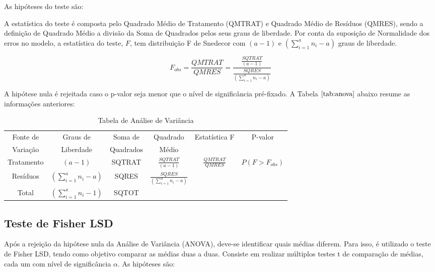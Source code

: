\documentclass[
]{estat/estat}
\begin{document}
As hipóteses do teste são:


A estatística do teste é composta pelo Quadrado Médio de Tratamento
(QMTRAT) e Quadrado Médio de Resíduos (QMRES), sendo a definição de
Quadrado Médio a divisão da Soma de Quadrados pelos seus graus de
liberdade. Por conta da suposição de Normalidade dos erros no modelo, a
estatística do teste, \(F\), tem distribuição F de Snedecor com
\((a - 1)\) e \((\sum_{i=1}^a n_i - a)\) graus de liberdade.

\[
F_{obs} = \frac{QMTRAT}{QMRES} = \frac{\frac{SQTRAT}{(a-1)}}{\frac{SQRES}{(\sum_{i=1}^a n_i - a)}}
\]

A hipótese nula é rejeitada caso o p-valor seja menor que o nível de
significância pré-fixado. A Tabela \(\ref{tab:anova}\) abaixo resume as
informações anteriores:

\begin{table}[H]
\centering
\caption{Tabela de Análise de Variância}
\begin{tabular}{c | c c c c c}
    \toprule 
    Fonte de & Graus de  & Soma de  & Quadrado  & \multirow{2}{*}{Estatística F} & \multirow{2}{*}{P-valor} \\ 
    Variação & Liberdade & Quadrados & Médio & & \\
    \midrule
    Tratamento & $(a-1)$ & SQTRAT & $\frac{SQTRAT}{(a-1)}$ & $\frac{QMTRAT}{QMRES}$ & $P(F>F_{obs})$ \\[5pt]
    Resíduos & $(\sum_{i=1}^a n_i - a)$ & SQRES & $\frac{SQRES}{(\sum_{i=1}^a n_i - a)}$ & & \\ 
    \midrule
    Total & $(\sum_{i=1}^a n_i - 1)$ & SQTOT & & & \\ 
    \bottomrule
\end{tabular}

\end{table}

\subsection{Teste de Fisher LSD}\label{teste-de-fisher-lsd}

Após a rejeição da hipótese nula da Análise de Variância (ANOVA),
deve-se identificar quais médias diferem. Para isso, é utilizado o teste
de Fisher LSD, tendo como objetivo comparar as médias duas a duas.
Consiste em realizar múltiplos testes t de comparação de médias, cada um
com nível de significância \(\alpha\). As hipóteses são:
\end{document}
